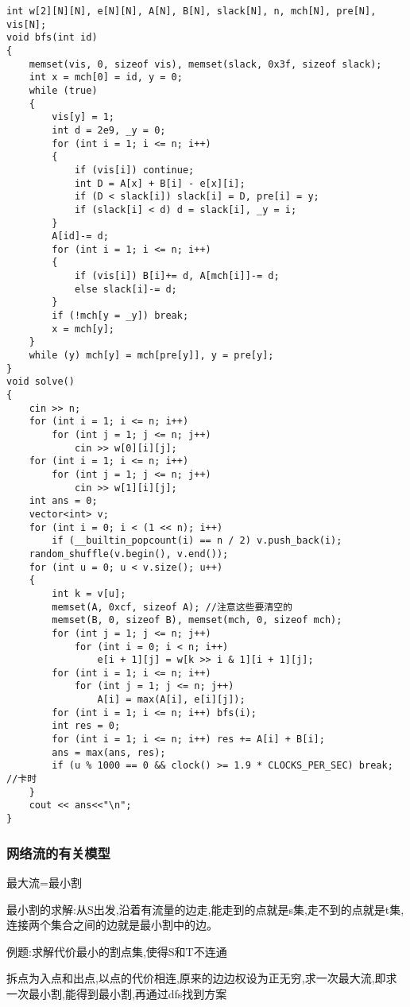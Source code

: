\documentclass[a4paper,fontset=none]{ctexart}
\begin{document}
\begin{verbatim}
int w[2][N][N], e[N][N], A[N], B[N], slack[N], n, mch[N], pre[N], vis[N];
void bfs(int id)
{
    memset(vis, 0, sizeof vis), memset(slack, 0x3f, sizeof slack);
    int x = mch[0] = id, y = 0;
    while (true)
    {
        vis[y] = 1;
        int d = 2e9, _y = 0;
        for (int i = 1; i <= n; i++)
        {
            if (vis[i]) continue;
            int D = A[x] + B[i] - e[x][i];
            if (D < slack[i]) slack[i] = D, pre[i] = y;
            if (slack[i] < d) d = slack[i], _y = i;
        }
        A[id]-= d;
        for (int i = 1; i <= n; i++)
        {
            if (vis[i]) B[i]+= d, A[mch[i]]-= d;
            else slack[i]-= d;
        }
        if (!mch[y = _y]) break;
        x = mch[y];
    }
    while (y) mch[y] = mch[pre[y]], y = pre[y];
}
void solve()
{
    cin >> n;
    for (int i = 1; i <= n; i++)
        for (int j = 1; j <= n; j++)
            cin >> w[0][i][j];
    for (int i = 1; i <= n; i++)
        for (int j = 1; j <= n; j++)
            cin >> w[1][i][j];
    int ans = 0;
    vector<int> v;
    for (int i = 0; i < (1 << n); i++)
        if (__builtin_popcount(i) == n / 2) v.push_back(i);
    random_shuffle(v.begin(), v.end());
    for (int u = 0; u < v.size(); u++)
    {
        int k = v[u];
        memset(A, 0xcf, sizeof A); //注意这些要清空的
        memset(B, 0, sizeof B), memset(mch, 0, sizeof mch);
        for (int j = 1; j <= n; j++)
            for (int i = 0; i < n; i++)
                e[i + 1][j] = w[k >> i & 1][i + 1][j];
        for (int i = 1; i <= n; i++)
            for (int j = 1; j <= n; j++)
                A[i] = max(A[i], e[i][j]);
        for (int i = 1; i <= n; i++) bfs(i);
        int res = 0;
        for (int i = 1; i <= n; i++) res += A[i] + B[i];
        ans = max(ans, res);
        if (u % 1000 == 0 && clock() >= 1.9 * CLOCKS_PER_SEC) break; //卡时
    }
    cout << ans<<"\n";
}
\end{verbatim}
\subsubsection{网络流的有关模型}

最大流=最小割

最小割的求解:从S出发,沿着有流量的边走,能走到的点就是s集,走不到的点就是t集,连接两个集合之间的边就是最小割中的边。

例题:求解代价最小的割点集,使得S和T不连通

拆点为入点和出点,以点的代价相连,原来的边边权设为正无穷,求一次最大流,即求一次最小割,能得到最小割,再通过dfs找到方案
\end{document}

